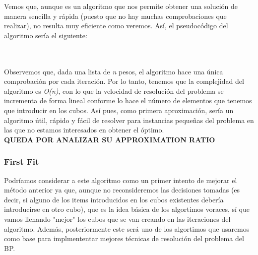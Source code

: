 \documentclass[a4paper, 12pt, oneside]{book}
\begin{document}
	Vemos que, aunque es un algoritmo que nos permite obtener una soluci\'on de manera sencilla y r\'apida (puesto que no hay muchas comprobaciones que realizar), no resulta muy eficiente como veremos. As\'i, el pseudoc\'odigo del algoritmo ser\'ia el siguiente:
	
	\noindent{}
	\\\\
	
	Observemos que, dada una lista de \textit{n} pesos, el algoritmo hace una \'unica comprobaci\'on por cada iteraci\'on. Por lo tanto, tenemos que la complejidad del algoritmo es \textit{O(n)}, con lo que la velocidad de resoluci\'on del problema se incrementa de forma lineal conforme lo hace el n\'umero de elementos que tenemos que introducir en los cubos. As\'i pues, como primera aproximaci\'on, ser\'ia un algoritmo \'util, r\'apido y f\'acil de resolver para instancias peque\~{n}as del problema en las que no estamos interesados en obtener el \'optimo.
	\\
	
	\textbf{QUEDA POR ANALIZAR SU APPROXIMATION RATIO}
	
	\subsubsection{First Fit}
	Podr\'iamos considerar a este algoritmo como un primer intento de mejorar el m\'etodo anterior ya que, aunque no reconsideremos las decisiones tomadas (es decir, si alguno de los items introducidos en los cubos existentes deber\'ia introducirse en otro cubo), que es la idea b\'asica de los algortimos voraces, s\'i que vamos llenando "mejor" los cubos que se van creando en las iteraciones del algoritmo. Adem\'as, posteriormente este ser\'a uno de los algortimos que usaremos como base para implmententar mejores t\'ecnicas de resoluci\'on del problema del BP.
	\\
	
\end{document}
